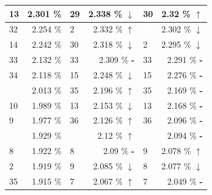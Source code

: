 \documentclass[letterpaper]{article}
\newcommand{\caseUp}[1][]{#1\textcolor[HTML]{008000}{$\mathbf{\uparrow}$}}
\newcommand{\caseStable}[1][]{#1\textcolor[HTML]{3779dd}{\textbf{-}}}
\newcommand{\caseDown}[1][]{#1\textcolor[HTML]{dd3737}{$\mathbf{\downarrow}$}}
\begin{document}
\begin{table}
\begin{tabular}{|l|r||l|r||l|r|}
	  \cellcolor[HTML]{FFFFF0} 13 & 2.301 \% & \cellcolor[HTML]{FFFFF0} 29 & 2.338 \% \caseDown[\hfill] & \cellcolor[HTML]{FFD700} 30 & 2.32 \% \caseUp[\hfill] \\ \hline
	  \cellcolor[HTML]{2E8B57} 32 & 2.254 \% & \cellcolor[HTML]{A0522D} 2 & 2.332 \% \caseUp[\hfill] & \cellcolor[HTML]{483D8B} \textcolor{white}{40} & 2.302 \% \caseDown[\hfill] \\ \hline
	  \cellcolor[HTML]{FF69B4} 14 & 2.242 \% & \cellcolor[HTML]{FFD700} 30 & 2.318 \% \caseDown[\hfill] & \cellcolor[HTML]{A0522D} 2 & 2.295 \% \caseDown[\hfill] \\ \hline
	  \cellcolor[HTML]{2E8B57} 33 & 2.132 \% & \cellcolor[HTML]{2E8B57} 33 & 2.309 \% \caseStable[\hfill] & \cellcolor[HTML]{2E8B57} 33 & 2.291 \% \caseStable[\hfill] \\ \hline
	  \cellcolor[HTML]{EEEED1} 34 & 2.118 \% & \cellcolor[HTML]{FF69B4} 15 & 2.248 \% \caseDown[\hfill] & \cellcolor[HTML]{FF69B4} 15 & 2.276 \% \caseStable[\hfill] \\ \hline
	  \cellcolor[HTML]{000000} \textcolor{white}{11} & 2.013 \% & \cellcolor[HTML]{2E8B57} 35 & 2.196 \% \caseUp[\hfill] & \cellcolor[HTML]{2E8B57} 35 & 2.169 \% \caseStable[\hfill] \\ \hline
	  \cellcolor[HTML]{1E90FF} 10 & 1.989 \% & \cellcolor[HTML]{FFFFF0} 13 & 2.153 \% \caseDown[\hfill] & \cellcolor[HTML]{FFFFF0} 13 & 2.168 \% \caseStable[\hfill] \\ \hline
	  \cellcolor[HTML]{1E90FF} 9 & 1.977 \% & \cellcolor[HTML]{E6E6FA} 36 & 2.126 \% \caseUp[\hfill] & \cellcolor[HTML]{E6E6FA} 36 & 2.096 \% \caseStable[\hfill] \\ \hline
	  \cellcolor[HTML]{483D8B} \textcolor{white}{40} & 1.929 \% & \cellcolor[HTML]{8B1A1A} \textcolor{white}{5} & 2.12 \% \caseUp[\hfill] & \cellcolor[HTML]{8B1A1A} \textcolor{white}{5} & 2.094 \% \caseStable[\hfill] \\ \hline
	  \cellcolor[HTML]{FFC1C1} 8 & 1.922 \% & \cellcolor[HTML]{FFC1C1} 8 & 2.09 \% \caseStable[\hfill] & \cellcolor[HTML]{1E90FF} 9 & 2.078 \% \caseUp[\hfill] \\ \hline
	  \cellcolor[HTML]{A0522D} 2 & 1.919 \% & \cellcolor[HTML]{1E90FF} 9 & 2.085 \% \caseDown[\hfill] & \cellcolor[HTML]{FFC1C1} 8 & 2.077 \% \caseDown[\hfill] \\ \hline
	  \cellcolor[HTML]{2E8B57} 35 & 1.915 \% & \cellcolor[HTML]{1E90FF} 7 & 2.067 \% \caseUp[\hfill] & \cellcolor[HTML]{1E90FF} 7 & 2.049 \% \caseStable[\hfill] \\ \hline

\end{tabular}
\end{table}
\end{document}
